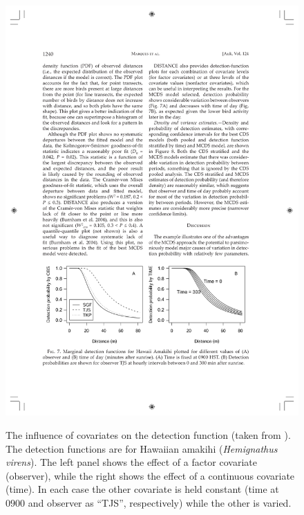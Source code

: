 \begin{figure}
\centering
\includegraphics{intro/figs/amakihi-detfct.pdf}\\
\caption{The influence of covariates on the detection function (taken from \cite{amakihi}). The detection functions are for Hawaiian amakihi (\textit{Hemignathus virens}). The left panel shows the effect of a factor covariate (observer), while the right shows the effect of a continuous covariate (time). In each case the other covariate is held constant (time at $0900$ and observer as ``TJS'', respectively) while the other is varied.}
\label{ds-covarex}
\end{figure}

